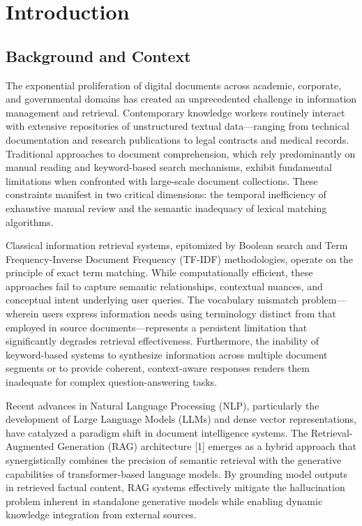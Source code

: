 
\chapter{Introduction}

\section{Background and Context}

The exponential proliferation of digital documents across academic, corporate, and governmental domains has created an unprecedented challenge in information management and retrieval. Contemporary knowledge workers routinely interact with extensive repositories of unstructured textual data---ranging from technical documentation and research publications to legal contracts and medical records. Traditional approaches to document comprehension, which rely predominantly on manual reading and keyword-based search mechanisms, exhibit fundamental limitations when confronted with large-scale document collections. These constraints manifest in two critical dimensions: the temporal inefficiency of exhaustive manual review and the semantic inadequacy of lexical matching algorithms.

Classical information retrieval systems, epitomized by Boolean search and Term Frequency-Inverse Document Frequency (TF-IDF) methodologies, operate on the principle of exact term matching. While computationally efficient, these approaches fail to capture semantic relationships, contextual nuances, and conceptual intent underlying user queries. The vocabulary mismatch problem---wherein users express information needs using terminology distinct from that employed in source documents---represents a persistent limitation that significantly degrades retrieval effectiveness. Furthermore, the inability of keyword-based systems to synthesize information across multiple document segments or to provide coherent, context-aware responses renders them inadequate for complex question-answering tasks.

Recent advances in Natural Language Processing (NLP), particularly the development of Large Language Models (LLMs) and dense vector representations, have catalyzed a paradigm shift in document intelligence systems. The Retrieval-Augmented Generation (RAG) architecture [1] emerges as a hybrid approach that synergistically combines the precision of semantic retrieval with the generative capabilities of transformer-based language models. By grounding model outputs in retrieved factual content, RAG systems effectively mitigate the hallucination problem inherent in standalone generative models while enabling dynamic knowledge integration from external sources.

